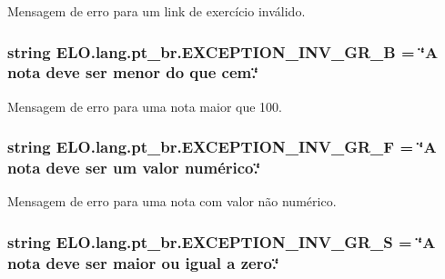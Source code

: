 Mensagem de erro para um link de exercício inválido. 

\hypertarget{namespaceELO_1_1lang_1_1pt__br_a68c2963160eddf7e83f68cba601ebb7d}{
\subsubsection[{E\-X\-C\-E\-P\-T\-I\-O\-N\-\_\-\-I\-N\-V\-\_\-\-G\-R\-\_\-\-B}]{\setlength{\rightskip}{0pt plus 5cm}string E\-L\-O.\-lang.\-pt\-\_\-br.\-E\-X\-C\-E\-P\-T\-I\-O\-N\-\_\-\-I\-N\-V\-\_\-\-G\-R\-\_\-\-B = \char`\"{}A nota deve ser menor do que cem.\char`\"{}}}\label{d5/d70/namespaceELO_1_1lang_1_1pt__br_a68c2963160eddf7e83f68cba601ebb7d}


Mensagem de erro para uma nota maior que 100. 

\hypertarget{namespaceELO_1_1lang_1_1pt__br_a50b59c97fa4fc79305e05bfd0ffbeb8a}{
\subsubsection[{E\-X\-C\-E\-P\-T\-I\-O\-N\-\_\-\-I\-N\-V\-\_\-\-G\-R\-\_\-\-F}]{\setlength{\rightskip}{0pt plus 5cm}string E\-L\-O.\-lang.\-pt\-\_\-br.\-E\-X\-C\-E\-P\-T\-I\-O\-N\-\_\-\-I\-N\-V\-\_\-\-G\-R\-\_\-\-F = \char`\"{}A nota deve ser um valor numérico.\char`\"{}}}\label{d5/d70/namespaceELO_1_1lang_1_1pt__br_a50b59c97fa4fc79305e05bfd0ffbeb8a}


Mensagem de erro para uma nota com valor não numérico. 

\hypertarget{namespaceELO_1_1lang_1_1pt__br_aa145dfa8cb4cf5ed4e5ba3cfeaa0d778}{
\subsubsection[{E\-X\-C\-E\-P\-T\-I\-O\-N\-\_\-\-I\-N\-V\-\_\-\-G\-R\-\_\-\-S}]{\setlength{\rightskip}{0pt plus 5cm}string E\-L\-O.\-lang.\-pt\-\_\-br.\-E\-X\-C\-E\-P\-T\-I\-O\-N\-\_\-\-I\-N\-V\-\_\-\-G\-R\-\_\-\-S = \char`\"{}A nota deve ser maior ou igual a zero.\char`\"{}}}\label{d5/d70/namespaceELO_1_1lang_1_1pt__br_aa145dfa8cb4cf5ed4e5ba3cfeaa0d778}


